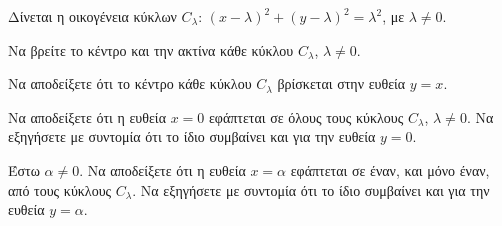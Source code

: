 \begin{figure}
\end{figure}

Δίνεται η οικογένεια κύκλων $C_\lambda$: $(x - \lambda)^2 + (y - \lambda)^2 = \lambda^2$, με $\lambda \neq 0$.

\begin{alist}
\item Να βρείτε το κέντρο και την ακτίνα κάθε κύκλου $C_\lambda$, $\lambda \neq 0$. 
\item Να αποδείξετε ότι το κέντρο κάθε κύκλου $C_\lambda$ βρίσκεται στην ευθεία $y = x$. 
\item Να αποδείξετε ότι η ευθεία $x = 0$ εφάπτεται σε όλους τους κύκλους $C_\lambda$, $\lambda \neq 0$. Να εξηγήσετε με συντομία ότι το ίδιο συμβαίνει και για την ευθεία $y = 0$. 
\item Έστω $\alpha \neq 0$. Να αποδείξετε ότι η ευθεία $x = \alpha$ εφάπτεται σε έναν, και μόνο έναν, από τους κύκλους $C_\lambda$. Να εξηγήσετε με συντομία ότι το ίδιο συμβαίνει και για την ευθεία $y = \alpha$. 
\end{alist}